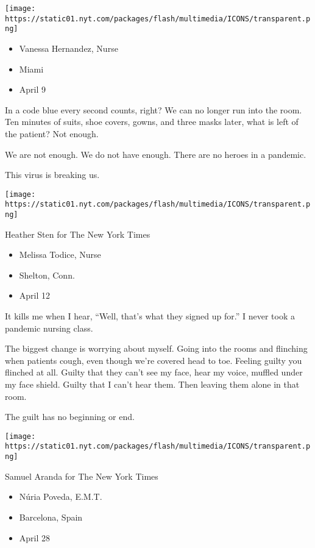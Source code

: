 \texttt{[image: https://static01.nyt.com/packages/flash/multimedia/ICONS/transparent.png]}

\begin{itemize}
\tightlist
\item
  Vanessa Hernandez, Nurse
\item
  Miami
\item
  April 9
\end{itemize}

In a code blue every second counts, right? We can no longer run into the
room. Ten minutes of suits, shoe covers, gowns, and three masks later,
what is left of the patient? Not enough.

We are not enough. We do not have enough. There are no heroes in a
pandemic.

This virus is breaking us.

\texttt{[image: https://static01.nyt.com/packages/flash/multimedia/ICONS/transparent.png]}

Heather Sten for The New York Times

\begin{itemize}
\tightlist
\item
  Melissa Todice, Nurse
\item
  Shelton, Conn.
\item
  April 12
\end{itemize}

It kills me when I hear, ``Well, that's what they signed up for.'' I
never took a pandemic nursing class.

The biggest change is worrying about myself. Going into the rooms and
flinching when patients cough, even though we're covered head to toe.
Feeling guilty you flinched at all. Guilty that they can't see my face,
hear my voice, muffled under my face shield. Guilty that I can't hear
them. Then leaving them alone in that room.

The guilt has no beginning or end.

\texttt{[image: https://static01.nyt.com/packages/flash/multimedia/ICONS/transparent.png]}

Samuel Aranda for The New York Times

\begin{itemize}
\tightlist
\item
  Núria Poveda, E.M.T.
\item
  Barcelona, Spain
\item
  April 28
\end{itemize}


